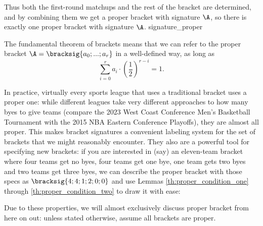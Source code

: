 {{    Thus both the first-round matchups and the rest of the bracket are determined, and by combining them we get a proper bracket with signature $\A$, so there is exactly one proper bracket with signature $\A$.
}{signature_proper}

The fundamental theorem of brackets means that we can refer to the proper bracket $\A = \bracksig{a_0; ...; a_r}$ in a well-defined way, as long as $$\sum_{i=0}^r a_i \cdot \left(\frac{1}{2}\right)^{r - i} = 1.$$

In practice, virtually every sports league that uses a traditional bracket uses a proper one: while different leagues take very different approaches to how many byes to give teams (compare the 2023 West Coast Conference Men's Basketball Tournament with the 2015 NBA Eastern Conference Playoffs), they are almost all proper. This makes bracket signatures a convenient labeling system for the set of brackets that we might reasonably encounter. They also are a powerful tool for specifying new brackets: if you are interested in (say) an eleven-team bracket where four teams get no byes, four teams get one bye, one team gets two byes and two teams get three byes, we can describe the proper bracket with those specs as $\bracksig{4; 4; 1; 2; 0; 0}$ and use Lemmas \ref{th:proper_condition_one} through \ref{th:proper_condition_two} to draw it with ease:


Due to these properties, we will almost exclusively discuss proper bracket from here on out: unless stated otherwise, assume all brackets are proper.
}